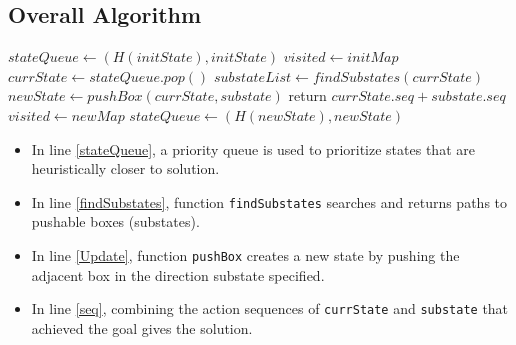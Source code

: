 \documentclass[a4paper, 10pt]{article}
\begin{document}
        \subsection{Overall Algorithm}
            \begin{algorithmic}[1] 
                \State $stateQueue \gets (H(initState), initState)$ \label{stateQueue}
                \State $visited \gets initMap$
                    \State $currState \gets stateQueue.pop()$
                    \State $substateList \gets findSubstates(currState)$ \label{findSubstates}
                        \State $newState \gets pushBox(currState, substate)$ \label{Update}
                            \State return $currState.seq + substate.seq$ \label{seq}
                        \EndIf
                            \State $visited \gets newMap$
                             \label{deadlock}
                                \State $stateQueue \gets (H(newState), newState)$
                            \EndIf
                        \EndIf
                    \EndFor
                \EndWhile
            \end{algorithmic}

            \begin{itemize}
                \item In line \ref{stateQueue}, a priority queue is used to 
                    prioritize states that are heuristically closer to solution.
                \item In line \ref{findSubstates}, function \texttt{findSubstates} searches and returns
                    paths to pushable boxes (substates).
                \item In line \ref{Update}, function \texttt{pushBox} creates a new state by 
                    pushing the adjacent box in the direction substate specified.
                \item In line \ref{seq}, combining the action sequences of \texttt{currState} 
                    and \texttt{substate} that achieved the goal gives the solution.
            \end{itemize}
\end{document}
